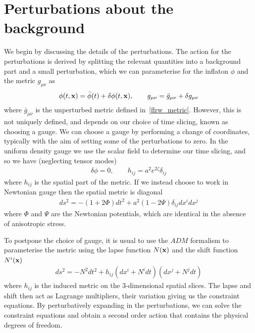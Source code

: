 \section{Perturbations about the background}
    We begin by discussing the details of the perturbations.
    The action for the perturbations is derived by
    splitting the relevant quantities into a background
    part and a small perturbation, which we can parameterise
    for the inflaton $\phi$ and the metric $g_{\mu\nu}$ as
    \begin{align}
        \phi(t,\mathbf{x})=\bar{\phi}(t)+\delta\phi(t,\mathbf{x}), \qquad g_{\mu\nu}=\bar{g}_{\mu\nu}+\delta g_{\mu\nu}
    \end{align}
    where $\bar{g}_{\mu\nu}$ is the unperturbed metric defined in~\eqref{flrw_metric}.
    However, this is not uniquely defined, and depends on our choice of time slicing,
    known as choosing a gauge.
    We can choose a gauge by performing a change of coordinates, typically with
    the aim of setting some of the perturbations to zero.
    In the uniform density gauge we use the scalar field to determine our time slicing,
    and so we have (neglecting tensor modes)
    \begin{align}
        \delta \phi=0, \qquad h_{ij}=a^2 e^{2\zeta} \delta_{ij}
    \end{align}
    where $h_{ij}$ is the spatial part of the metric.
    If we instead choose to work in Newtonian gauge then the spatial metric is diagonal
    \begin{align}\label{newtonian_metric}
        ds^2 = -(1+2\Phi)dt^2+a^2(1-2\Psi)\delta_{ij}dx^idx^j
    \end{align}
    where $\Phi$ and $\Psi$ are the Newtonian potentials, which are identical
    in the absence of anisotropic stress.


    To postpone the choice of gauge, it is usual to use the $ADM$ formalism
    to parameterise the metric using the lapse function $N(\mathbf{x})$
    and the shift function $N^i(\mathbf{x})$
    \begin{align}\label{adm_metric}
        ds^2 = -N^2dt^2+h_{ij}\left(dx^i+N^idt\right)\left(dx^j+N^jdt\right)
    \end{align}
    where $h_{ij}$ is the induced metric on the 3-dimensional spatial slices.
    The lapse and shift then act as Lagrange multipliers, their variation giving us the constraint
    equations.
    By perturbatively expanding in the perturbations,
    we can solve the constraint equations and obtain a second order action that contains
    the physical degrees of freedom.

